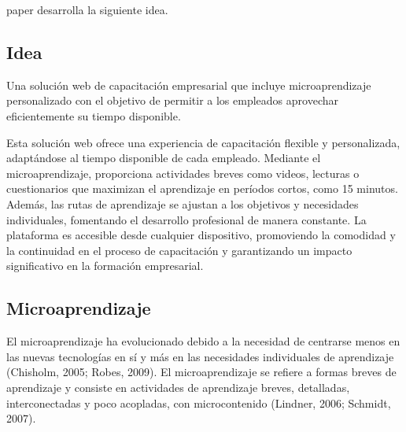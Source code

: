  paper desarrolla la siguiente idea.

\subsection{Idea}
Una solución web de capacitación empresarial que incluye microaprendizaje personalizado con el objetivo de permitir
a los empleados aprovechar eficientemente su tiempo disponible.

Esta solución web ofrece una experiencia de capacitación flexible y personalizada,
adaptándose al tiempo disponible de cada empleado.
Mediante el microaprendizaje, proporciona actividades breves como videos,
lecturas o cuestionarios que maximizan el aprendizaje en períodos cortos,
como 15 minutos. Además, las rutas de aprendizaje se ajustan a los objetivos y necesidades individuales,
fomentando el desarrollo profesional de manera constante. La plataforma es accesible desde cualquier dispositivo,
promoviendo la comodidad y la continuidad en el proceso de capacitación y garantizando un impacto significativo en la
formación empresarial.

\subsection{Microaprendizaje}
El microaprendizaje ha evolucionado debido a la necesidad de centrarse menos en las nuevas tecnologías en sí y más en
las necesidades individuales de aprendizaje (Chisholm, 2005; Robes, 2009). El microaprendizaje se refiere a formas breves
de aprendizaje y consiste en actividades de aprendizaje breves, detalladas, interconectadas y poco acopladas,
con microcontenido (Lindner, 2006; Schmidt, 2007).
\cite{article:microlearning_buchem}




